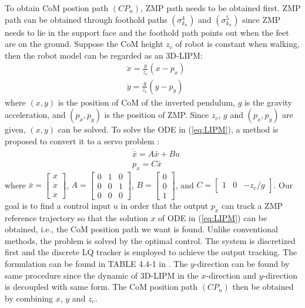 \documentclass{ieeeaccess}
\begin{document}
To obtain CoM postion path $(CP_n)$, ZMP path needs to be obtained first. ZMP path can be obtained through foothold paths $(\sigma^{4}_{k_n})$ and $(\sigma^{5}_{k_n})$ since ZMP needs to lie in the support face and the foothold path points out when the feet are on the ground. Suppose the CoM height $z_c$ of robot is constant when walking, then the robot model can be regarded as an 3D-LIPM:
\begin{equation} \label{eq:LIPM}
    \begin{split}
        & \ddot{x} = \frac{g}{z_c}(x - p_x) \\
        & \ddot{y} = \frac{g}{z_c}(y - p_y)
    \end{split}
\end{equation}
where $(x,y)$ is the position of CoM of the inverted pendulum, $g$ is the gravity acceleration, and $(p_x,p_y)$ is the position of ZMP. Since $z_c$, $g$ and $(p_x,p_y)$ are given, $(x,y)$ can be solved. To solve the ODE in (\ref{eq:LIPM}), a method is proposed to convert it to a servo problem \cite{1241826}:
\begin{equation} \label{eq:output tracking}
    \begin{split}
        & \dot{\bar{x}} = A\bar{x} + Bu \\
        & p_x = C\bar{x}
    \end{split}
\end{equation}
where $\bar{x} = \begin{bmatrix}
    x \\ \dot{x} \\ \ddot{x}
\end{bmatrix}$, $A = \begin{bmatrix}
    0 & 1 & 0 \\ 0 & 0 & 1 \\ 0 & 0 & 0
\end{bmatrix}$, $B = \begin{bmatrix}
    0 \\ 0 \\ 1
\end{bmatrix}$, and $C = \begin{bmatrix}
    1 & 0 & -z_c/g
\end{bmatrix}$. Our goal is to find a control input $u$ in order that the output $p_x$ can track a ZMP reference trajectory so that the solution $x$ of ODE in (\ref{eq:LIPM}) can be obtained, i.e., the CoM position path we want is found. Unlike conventional methods, the problem is solved by the optimal control. The system is discretized first and the discrete LQ tracker is employed to achieve the output tracking. The formulation can be found in TABLE 4.4-1 in \cite{lewis2012optimal}. The $y$-direction can be found by same procedure since the dynamic of 3D-LIPM in the $x$-direction and $y$-direction is decoupled with same form. The CoM position path $(CP_n)$ then be obtained by combining $x$, $y$ and $z_c$.
\end{document}
